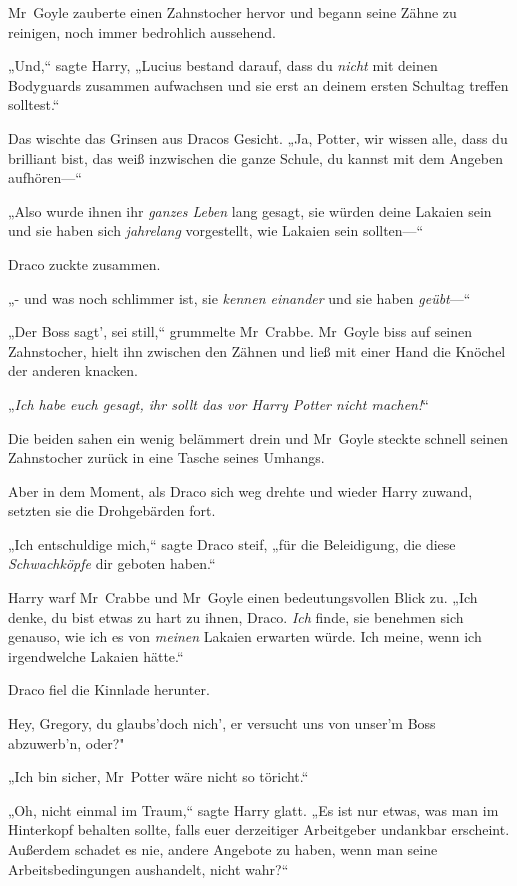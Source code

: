 {Mr~Goyle zauberte einen Zahnstocher hervor und begann seine Zähne zu reinigen, noch immer bedrohlich aussehend.

„Und,“ sagte Harry, „Lucius bestand darauf, dass du \emph{nicht} mit deinen Bodyguards zusammen aufwachsen und sie erst an deinem ersten Schultag treffen solltest.“

Das wischte das Grinsen aus Dracos Gesicht. „Ja, Potter, wir wissen alle, dass du brilliant bist, das weiß inzwischen die ganze Schule, du kannst mit dem Angeben aufhören—“

„Also wurde ihnen ihr \emph{ganzes Leben} lang gesagt, sie würden deine Lakaien sein und sie haben sich \emph{jahrelang} vorgestellt, wie Lakaien sein sollten—“

Draco zuckte zusammen.

„- und was noch schlimmer ist, sie \emph{kennen einander} und sie haben \emph{geübt}—“

„Der Boss sagt', sei still,“ grummelte Mr~Crabbe. Mr~Goyle biss auf seinen Zahnstocher, hielt ihn zwischen den Zähnen und ließ mit einer Hand die Knöchel der anderen knacken.

„\emph{Ich habe euch gesagt, ihr sollt das vor Harry Potter nicht machen!}“

Die beiden sahen ein wenig belämmert drein und Mr~Goyle steckte schnell seinen Zahnstocher zurück in eine Tasche seines Umhangs.

Aber in dem Moment, als Draco sich weg drehte und wieder Harry zuwand, setzten sie die Drohgebärden fort.

„Ich entschuldige mich,“ sagte Draco steif, „für die Beleidigung, die diese \emph{Schwachköpfe} dir geboten haben.“

Harry warf Mr~Crabbe und Mr~Goyle einen bedeutungsvollen Blick zu. „Ich denke, du bist etwas zu hart zu ihnen, Draco. \emph{Ich} finde, sie benehmen sich genauso, wie ich es von \emph{meinen} Lakaien erwarten würde. Ich meine, wenn ich irgendwelche Lakaien hätte.“

Draco fiel die Kinnlade herunter.

Hey, Gregory, du glaubs'doch nich', er versucht uns von unser'm Boss abzuwerb'n, oder?"

„Ich bin sicher, Mr~Potter wäre nicht so töricht.“

„Oh, nicht einmal im Traum,“ sagte Harry glatt. „Es ist nur etwas, was man im Hinterkopf behalten sollte, falls euer derzeitiger Arbeitgeber undankbar erscheint. Außerdem schadet es nie, andere Angebote zu haben, wenn man seine Arbeitsbedingungen aushandelt, nicht wahr?“

}
